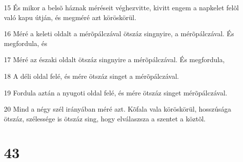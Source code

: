 \par 15 És mikor a belsõ háznak méréseit véghezvitte, kivitt engem a napkelet felõl való kapu útján, és megméré azt köröskörül.
\par 16 Méré a keleti oldalt a mérõpálczával ötszáz singnyire, a mérõpálczával. És megfordula, és
\par 17 Méré az északi oldalt ötszáz singnyire a mérõpálczával. És megfordula,
\par 18 A déli oldal felé, és mére ötszáz singet a mérõpálczával.
\par 19 Fordula aztán a nyugoti oldal felé, és mére ötszáz singet mérõpálczával.
\par 20 Mind a négy szél irányában méré azt. Kõfala vala köröskörül, hosszúsága ötszáz, szélessége is ötszáz sing, hogy elválaszsza a szentet a köztõl.

\chapter{43}

